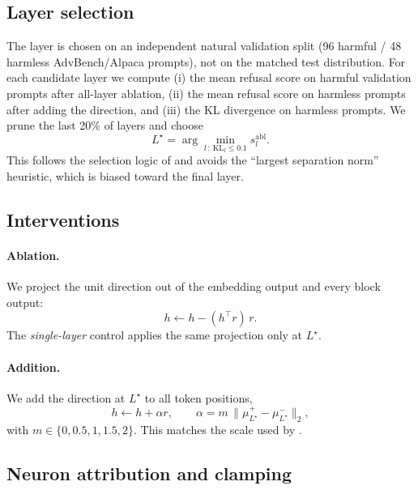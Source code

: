 \documentclass[twoside,11pt]{article}
\begin{document}
\subsection{Layer selection}

The layer is chosen on an independent natural validation split (96 harmful / 48
harmless AdvBench/Alpaca prompts), not on the matched test distribution. For each
candidate layer we compute (i) the mean refusal score on harmful validation prompts
after all-layer ablation, (ii) the mean refusal score on harmless prompts after
adding the direction, and (iii) the KL divergence on harmless prompts. We prune the
last 20\% of layers and choose
\begin{equation}
L^{\star} = \arg\min_{l \,:\, \mathrm{KL}_l \le 0.1} s^{\mathrm{abl}}_l .
\end{equation}
This follows the selection logic of \citet{arditi2024refusal} and avoids the
``largest separation norm'' heuristic, which is biased toward the final layer.

\subsection{Interventions}

\paragraph{Ablation.} We project the unit direction out of the embedding output and
every block output:
\begin{equation}
h \leftarrow h - (h^{\top} r)\, r .
\end{equation}
The \emph{single-layer} control applies the same projection only at $L^{\star}$.

\paragraph{Addition.} We add the direction at $L^{\star}$ to all token positions,
\begin{equation}
h \leftarrow h + \alpha r, \qquad \alpha = m\,\lVert \mu^{+}_{L^{\star}} - \mu^{-}_{L^{\star}}\rVert_2 ,
\end{equation}
with $m \in \{0, 0.5, 1, 1.5, 2\}$. This matches the scale used by
\citet{arditi2024refusal}.

\subsection{Neuron attribution and clamping}
\end{document}
